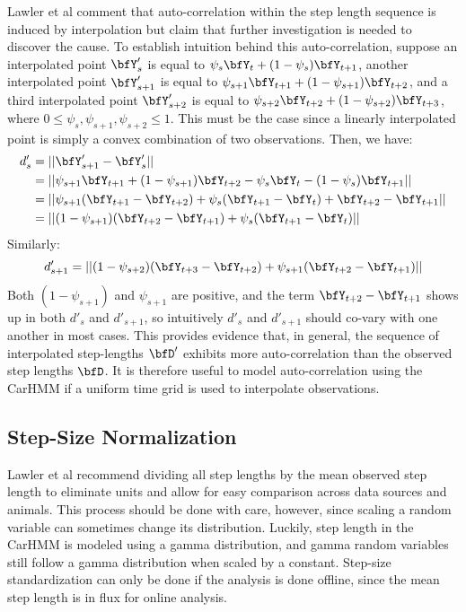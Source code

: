 Lawler et al comment that auto-correlation within the step length sequence is induced by interpolation but claim that further investigation is needed to discover the cause. To establish intuition behind this auto-correlation, suppose an interpolated point $\bfY'_s$ is equal to $\psi_s \bfY_t + (1-\psi_s) \bfY_{t+1}$, another interpolated point $\bfY'_{s+1}$ is equal to $\psi_{s+1} \bfY_{t+1} + (1-\psi_{s+1}) \bfY_{t+2}$, and a third interpolated point $\bfY'_{s+2}$ is equal to $\psi_{s+2} \bfY_{t+2} + (1-\psi_{s+2}) \bfY_{t+3}$, where $0 \leq \psi_s,\psi_{s+1},\psi_{s+2} \leq 1$. This must be the case since a linearly interpolated point is simply a convex combination of two observations. Then, we have:
%
\begin{align*}
	d'_s &= ||\bfY'_{s+1} - \bfY'_s|| \\
	&= ||\psi_{s+1} \bfY_{t+1} + (1-\psi_{s+1}) \bfY_{t+2} - \psi_s \bfY_t - (1-\psi_s) \bfY_{t+1} || \\
	&= ||\psi_{s+1}(\bfY_{t+1} - \bfY_{t+2}) + \psi_s(\bfY_{t+1} - \bfY_t) + \bfY_{t+2} - \bfY_{t+1} ||  \\
	&= ||(1-\psi_{s+1})(\bfY_{t+2} - \bfY_{t+1}) + \psi_s(\bfY_{t+1} - \bfY_t)||
\end{align*}
%
Similarly:
%
$$d'_{s+1} = ||(1-\psi_{s+2})(\bfY_{t+3} - \bfY_{t+2}) + \psi_{s+1}(\bfY_{t+2} - \bfY_{t+1})||$$
%
Both $(1-\psi_{s+1})$ and $\psi_{s+1}$ are positive, and the term $\bfY_{t+2} - \bfY_{t+1}$ shows up in both $d'_s$ and $d'_{s+1}$, so intuitively $d'_s$ and $d'_{s+1}$ should co-vary with one another in most cases. This provides evidence that, in general, the sequence of interpolated step-lengths $\bfD'$ exhibits more auto-correlation than the observed step lengths $\bfD$. It is therefore useful to model auto-correlation using the CarHMM if a uniform time grid is used to interpolate observations.


\subsection{Step-Size Normalization}

Lawler et al recommend dividing all step lengths by the mean observed step length to eliminate units and allow for easy comparison across data sources and animals. This process should be done with care, however, since scaling a random variable can sometimes change its distribution. Luckily, step length in the CarHMM is modeled using a gamma distribution, and gamma random variables still follow a gamma distribution when scaled by a constant. Step-size standardization can only be done if the analysis is done offline, since the mean step length is in flux for online analysis.  



